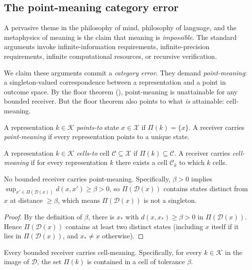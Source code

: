 \documentclass[11pt,twocolumn,a4paper]{article}
\newcommand{\K}{\mathcal{K}}
\newcommand{\D}{\mathcal{D}}
\newcommand{\X}{\mathcal{X}}
\newcommand{\Cell}{\mathcal{C}}
\begin{document}
\subsection{The point-meaning category error}

A pervasive theme in the philosophy of mind, philosophy of language,
and the metaphysics of meaning is the claim that meaning is
\emph{impossible}. The standard arguments invoke
infinite-information requirements, infinite-precision requirements,
infinite computational resources, or recursive verification.

We claim these arguments commit a \emph{category error}. They demand
\emph{point-meaning}: a singleton-valued correspondence between a
representation and a point in outcome space. By the floor theorem
(), point-meaning is unattainable for any bounded
receiver. But the floor theorem also points to what \emph{is}
attainable: cell-meaning.

\begin{definition}\label{def:point-meaning}
A representation $k\in\K$ \emph{points-to} state $x\in\X$ if
$\Pi(k)=\{x\}$. A receiver carries \emph{point-meaning} if every
representation points to a unique state.
\end{definition}

\begin{definition}\label{def:cell-meaning}
A representation $k\in\K$ \emph{cells-to} cell $\Cell\subseteq\X$ if
$\Pi(k)\subseteq\Cell$. A receiver carries \emph{cell-meaning} if for
every representation $k$ there exists a cell $\Cell_k$ to which $k$
cells.
\end{definition}

\begin{theorem}\label{thm:no-point}
No bounded receiver carries point-meaning. Specifically, $\beta>0$
implies $\sup_{x'\in\Pi(\D(x))}d(x,x')\ge\beta>0$, so $\Pi(\D(x))$
contains states distinct from $x$ at distance $\ge\beta$, which means
$\Pi(\D(x))$ is not a singleton.
\end{theorem}

\begin{proof}
By the definition of $\beta$, there is $x_*$ with
$d(x,x_*)\ge\beta>0$ in $\Pi(\D(x))$. Hence $\Pi(\D(x))$ contains at
least two distinct states (including $x$ itself if it lies in
$\Pi(\D(x))$, and $x_*\ne x$ otherwise).
\end{proof}

\begin{theorem}\label{thm:cell-meaning}
Every bounded receiver carries cell-meaning. Specifically, for every
$k\in\K$ in the image of $\D$, the set $\Pi(k)$ is contained in a
cell of tolerance $\beta$.
\end{theorem}
\end{document}
